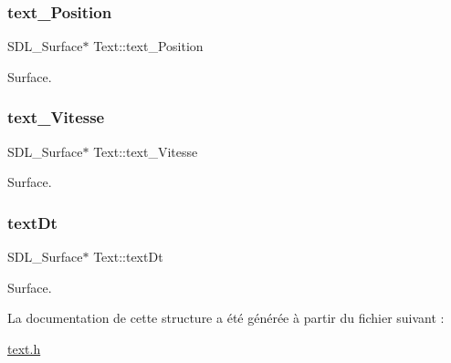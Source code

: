 \subsubsection{\texorpdfstring{text\+\_\+\+Position}{text\_Position}}
{\footnotesize\ttfamily S\+D\+L\+\_\+\+Surface$\ast$ Text\+::text\+\_\+\+Position}

Surface. \mbox{\label{structText_ad63fdcfb9a101546a60594eed8cac3e1}} 
\subsubsection{\texorpdfstring{text\+\_\+\+Vitesse}{text\_Vitesse}}
{\footnotesize\ttfamily S\+D\+L\+\_\+\+Surface$\ast$ Text\+::text\+\_\+\+Vitesse}

Surface. \mbox{\label{structText_aa9f1ddd6c46522be1712d469256e81ea}} 
\subsubsection{\texorpdfstring{text\+Dt}{textDt}}
{\footnotesize\ttfamily S\+D\+L\+\_\+\+Surface$\ast$ Text\+::text\+Dt}

Surface. 

La documentation de cette structure a été générée à partir du fichier suivant \+:\begin{DoxyCompactItemize}
\item 
\hyperlink{text_8h}{text.\+h}\end{DoxyCompactItemize}
